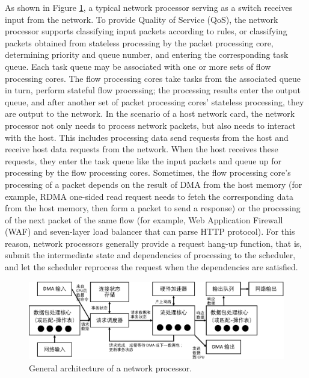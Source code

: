 As shown in Figure \ref{background:fig:network_processor}, a typical network processor serving as a switch receives input from the network. To provide Quality of Service (QoS), the network processor supports classifying input packets according to rules, or classifying packets obtained from stateless processing by the packet processing core, determining priority and queue number, and entering the corresponding task queue. Each task queue may be associated with one or more sets of flow processing cores. The flow processing cores take tasks from the associated queue in turn, perform stateful flow processing; the processing results enter the output queue, and after another set of packet processing cores' stateless processing, they are output to the network. In the scenario of a host network card, the network processor not only needs to process network packets, but also needs to interact with the host. This includes processing data send requests from the host and receive host data requests from the network. When the host receives these requests, they enter the task queue like the input packets and queue up for processing by the flow processing cores. Sometimes, the flow processing core's processing of a packet depends on the result of DMA from the host memory (for example, RDMA one-sided read request needs to fetch the corresponding data from the host memory, then form a packet to send a response) or the processing of the next packet of the same flow (for example, Web Application Firewall (WAF) and seven-layer load balancer that can parse HTTP protocol). For this reason, network processors generally provide a request hang-up function, that is, submit the intermediate state and dependencies of processing to the scheduler, and let the scheduler reprocess the request when the dependencies are satisfied.

\begin{figure}[htbp]
	\centering
	\includegraphics[width=1.0\textwidth]{figures/network_processor.pdf}
	\caption{General architecture of a network processor.}
	\label{background:fig:network_processor}
\end{figure}

